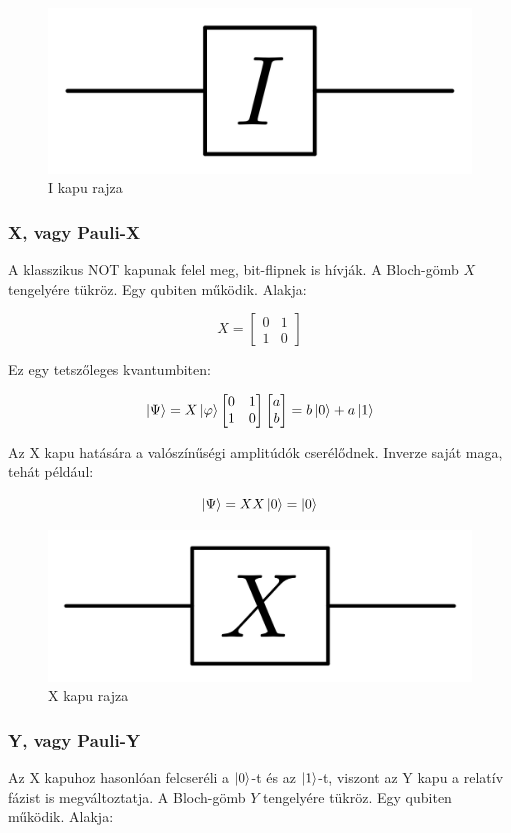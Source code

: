\documentclass[
]{thesis-ekf}
\theoremstyle{definition}
\theoremstyle{remark}
\begin{document}
\begin{figure}[H]
	\centering
	\includegraphics[width=0.3\linewidth]{Identity}
	\caption{I kapu rajza}
	\label{fig:identity}
\end{figure}


\subsubsection{X, vagy Pauli-X}
A klasszikus NOT kapunak felel meg, bit-flipnek is hívják. A Bloch-gömb $X$ tengelyére tükröz. Egy qubiten működik. Alakja:

\begin{equation}
	X= 
	\begin{bmatrix}
		0 & 1\\
		1 & 0
	\end{bmatrix}
\end{equation}

Ez egy tetszőleges kvantumbiten:

\begin{equation}
	\ket{\Psi}=X\ket{\varphi}
		\begin{bmatrix}
			0 & 1\\
			1 & 0
		\end{bmatrix}
		\begin{bmatrix}
			a\\
			b
		\end{bmatrix}=b\ket{0}+a\ket{1}
\end{equation}


Az X kapu hatására a valószínűségi amplitúdók cserélődnek. Inverze saját maga, tehát például:

\begin{equation}
	\ket{\Psi}=XX\ket{0}=\ket{0}
\end{equation}

\begin{figure}[H]
	\centering
	\includegraphics[width=0.3\linewidth]{Pauli_X}
	\caption{X kapu rajza}
	\label{fig:paulix}
\end{figure}


\subsubsection{Y, vagy Pauli-Y}
Az X kapuhoz hasonlóan felcseréli a $\ket{0}$-t és az $\ket{1}$-t, viszont az Y kapu a relatív fázist is megváltoztatja. A Bloch-gömb $Y$ tengelyére tükröz. Egy qubiten működik. Alakja:
\end{document}
